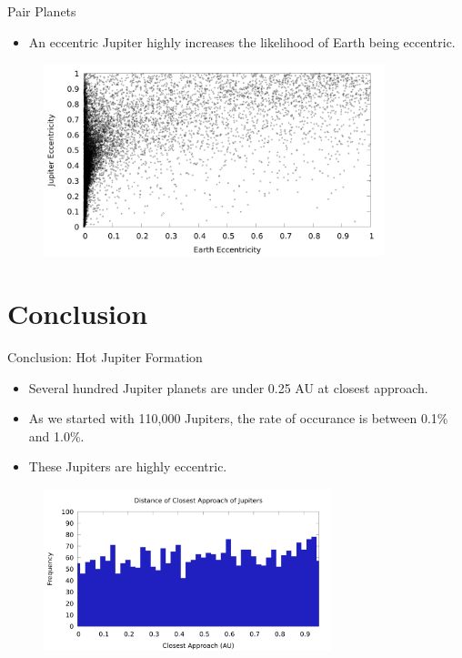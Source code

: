 \documentclass{beamer}
\begin{document}
\begin{frame}{Pair Planets}
    \begin{itemize}
        \item An eccentric Jupiter highly increases the likelihood of Earth being eccentric.
    \end{itemize}
    \begin{figure}
        \includegraphics[height=2.20in]{evj_ecc_earth_jupiter_1000.png}
    \end{figure}
\end{frame}

\section{Conclusion}

\begin{frame}{Conclusion: Hot Jupiter Formation}
    \begin{itemize}
        \item Several hundred Jupiter planets are under 0.25 AU at closest approach.
        \item As we started with 110,000 Jupiters, the rate of occurance is between 0.1\% and 1.0\%.
        \item These Jupiters are highly eccentric.
    \end{itemize}
    \begin{figure}
        \centering
        \includegraphics[height=1.85in]{periastron_jupiter_1000_close.png}
    \end{figure}
\end{frame}
\end{document}
